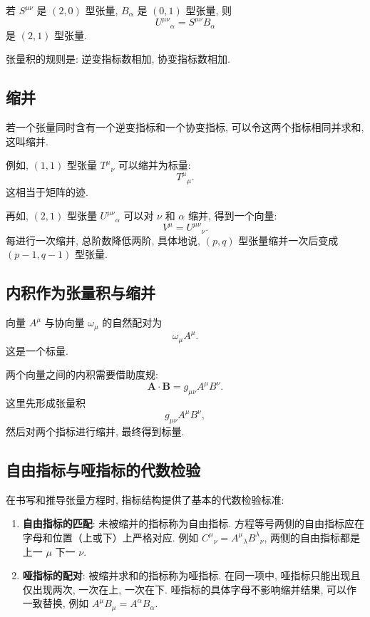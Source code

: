 若 $S^{\mu\nu}$ 是 $(2,0)$ 型张量, $B_\alpha$ 是 $(0,1)$ 型张量, 则
\[
U^{\mu\nu}{}_\alpha
=
S^{\mu\nu}B_\alpha
\]
是 $(2,1)$ 型张量. 

张量积的规则是: 逆变指标数相加, 协变指标数相加. 

\subsection{缩并}

若一个张量同时含有一个逆变指标和一个协变指标, 可以令这两个指标相同并求和, 这叫缩并. 

例如, $(1,1)$ 型张量 $T^\mu{}_\nu$ 可以缩并为标量: 
\[
T^\mu{}_\mu.
\]
这相当于矩阵的迹. 

再如, $(2,1)$ 型张量 $U^{\mu\nu}{}_\alpha$ 可以对 $\nu$ 和 $\alpha$ 缩并, 得到一个向量: 
\[
V^\mu
=
U^{\mu\nu}{}_\nu.
\]
每进行一次缩并, 总阶数降低两阶, 具体地说, $(p,q)$ 型张量缩并一次后变成 $(p-1,q-1)$ 型张量. 

\subsection{内积作为张量积与缩并}

向量 $A^\mu$ 与协向量 $\omega_\mu$ 的自然配对为
\[
\omega_\mu A^\mu.
\]
这是一个标量. 

两个向量之间的内积需要借助度规: 
\[
\bm{A}\cdot\bm{B}
=
g_{\mu\nu}A^\mu B^\nu.
\]
这里先形成张量积
\[
g_{\mu\nu}A^\mu B^\nu,
\]
然后对两个指标进行缩并, 最终得到标量. 

\subsection{自由指标与哑指标的代数检验}

在书写和推导张量方程时, 指标结构提供了基本的代数检验标准: 

\begin{enumerate}
\item \textbf{自由指标的匹配}: 未被缩并的指标称为自由指标. 方程等号两侧的自由指标应在字母和位置（上或下）上严格对应. 例如 $C^\mu{}_{\nu}=A^\mu{}_{\lambda}B^\lambda{}_{\nu}$, 两侧的自由指标都是上一 $\mu$ 下一 $\nu$. 
\item \textbf{哑指标的配对}: 被缩并求和的指标称为哑指标. 在同一项中, 哑指标只能出现且仅出现两次, 一次在上, 一次在下. 哑指标的具体字母不影响缩并结果, 可以作一致替换, 例如 $A^\mu B_{\mu}=A^\alpha B_{\alpha}$. 
\end{enumerate}

